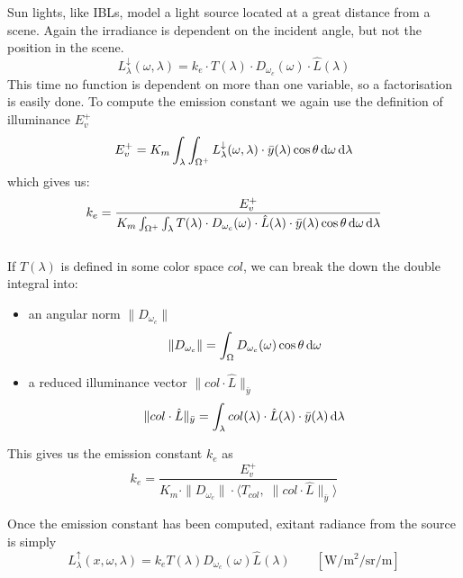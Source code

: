 Sun lights, like \glspl{IBL}, model a light source located at a great distance from
a scene. Again the irradiance is dependent on the incident angle, but not the
position in the scene.
\begin{equation}
L^\downarrow_{\lambda}(\omega,\lambda) = k_e\cdot T(\lambda)\cdot
D_{\omega_c}(\omega)\cdot \hat{L}(\lambda)
\end{equation}
This time no function is dependent on more than one variable, so a factorisation is easily done.
To compute the emission constant we again use the definition of illuminance
$E^+_v$
\begin{equation}
E^+_v = K_m \int_\lambda \int_{\Omega^+} L^\downarrow_{\lambda}(\omega,\lambda) \cdot\bar y(\lambda)\cos\theta\mathop{}\!\mathrm{d}\omega \mathop{}\!\mathrm{d}\lambda
\end{equation}
which gives us:
\begin{equation}
k_e = \frac{E^+_v}{K_m\int_{\Omega^+}\int_{\lambda} T(\lambda)\cdot D_{\omega_c}(\omega)\cdot \hat{L}(\lambda) \cdot \bar y(\lambda)\cos\theta\mathop{}\!\mathrm{d}\omega \mathop{}\!\mathrm{d}\lambda}
\end{equation}
\\
If $T(\lambda)$ is defined in some color space $col$, we can break the down the double integral into:
\begin{itemize}
\item an angular norm $\|D_{\omega_c}\|$
\begin{equation}
\|D_{\omega_c}\| = \int_\Omega D_{\omega_c}(\omega)\cos\theta\mathop{}\!\mathrm{d}\omega
\end{equation}
\item a reduced illuminance vector $\|col \cdot \hat{L}\|_{\bar{y}}$
\begin{equation}
\|col \cdot \hat{L}\|_{\bar{y}} = \int_\lambda col(\lambda)\cdot \hat{L}(\lambda)\cdot\bar{y}(\lambda)\mathop{}\!\mathrm{d}\lambda
\end{equation}
\end{itemize}
This gives us the emission constant $k_e$ as
\begin{equation}
k_e = \frac{E^+_v}{K_m\cdot \|D_{\omega_c}\|\cdot \big\langle T_{col}, \; \|col \cdot \hat{L}\|_{\bar{y}} \big\rangle}
\end{equation}

Once the emission constant has been computed, exitant radiance from the source
is simply
\begin{equation}
L^\uparrow_{\lambda}(x, \omega, \lambda) = k_e  T(\lambda)
D_{\omega_c}(\omega) \hat{L}(\lambda)
\qquad \left[\si{\watt\per\square\meter\per\steradian\per\meter}\right]
\end{equation}

